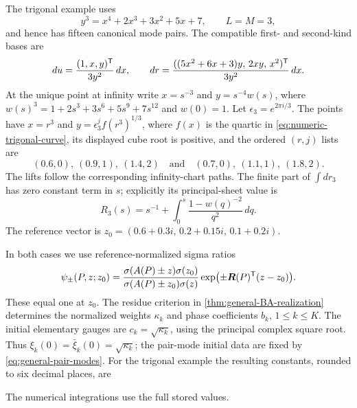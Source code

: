 The trigonal example uses
\begin{equation}\label{eq:numeric-trigonal-curve}
 y^3=x^4+2x^3+3x^2+5x+7,\qquad L=M=3,
\end{equation}
and hence has fifteen canonical mode pairs. The compatible
first- and second-kind bases are
\begin{equation}\label{eq:numeric-trigonal-bases}
 du=\frac{(1,x,y)^{\mathsf T}}{3y^2}\,dx,\qquad
 dr=\frac{((5x^2+6x+3)y,\,2xy,\,x^2)^{\mathsf T}}{3y^2}\,dx.
\end{equation}
At the unique point at infinity write $x=s^{-3}$ and
$y=s^{-4}w(s)$, where
$w(s)^3=1+2s^3+3s^6+5s^9+7s^{12}$ and $w(0)=1$.
Let $\epsilon_3=e^{2\pi i/3}$. The points have $x=r^3$ and
$y=\epsilon_3^j f(r^3)^{1/3}$, where $f(x)$ is the quartic in
\cref{eq:numeric-trigonal-curve}, its displayed cube root is positive,
and the ordered $(r,j)$ lists are
\[
 (0.6,0),\ (0.9,1),\ (1.4,2)
 \quad\text{and}\quad
 (0.7,0),\ (1.1,1),\ (1.8,2).
\]
The lifts follow the corresponding infinity-chart paths. The finite
part of $\int dr_3$ has zero constant term in $s$; explicitly its
principal-sheet value is
\[
 R_3(s)=s^{-1}+\int_0^s\frac{1-w(q)^{-2}}{q^2}\,dq.
\]
The reference vector is
$z_0=(0.6+0.3i,\,0.2+0.15i,\,0.1+0.2i)$.

In both cases we use reference-normalized sigma ratios
\begin{equation}\label{eq:numeric-reference-sigma}
 \psi_\pm(P,z;z_0)=
 \frac{\sigma(A(P)\pm z)\sigma(z_0)}
 {\sigma(A(P)\pm z_0)\sigma(z)}
 \exp\bigl(\pm\boldsymbol R(P)^{\mathsf T}(z-z_0)\bigr).
\end{equation}
These equal one at $z_0$. The residue criterion in
\cref{thm:general-BA-realization} determines the normalized weights
$\kappa_k$ and phase coefficients $b_k$, $1\leq k\leq K$.
The initial elementary gauges are $c_k=\sqrt{\kappa_k}$, using the
principal complex square root. Thus
$\xi_k(0)=\bar{\xi}_k(0)=\sqrt{\kappa_k}$; the pair-mode initial data
are fixed by \cref{eq:general-pair-modes}.
For the trigonal example the resulting constants, rounded to six
decimal places, are

The numerical integrations use the full stored values.

